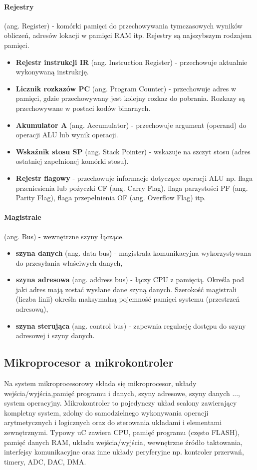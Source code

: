 \documentclass[a4paper,twoside]{report}
\begin{document}
\paragraph{Rejestry} (ang. Register) - komórki pamięci do przechowywania tymczasowych wyników obliczeń, adresów lokacji w pamięci RAM itp. Rejestry są najszybszym rodzajem pamięci.
\begin{itemize}
\item \textbf{Rejestr instrukcji IR} (ang. Instruction Register) - przechowuje aktualnie wykonywaną instrukcję.
\item\textbf{ Licznik rozkazów PC} (ang. Program Counter) - przechowuje adres w pamięci, gdzie przechowywany jest kolejny rozkaz do pobrania. Rozkazy są przechowywane w postaci kodów binarnych.
\item \textbf{Akumulator A} (ang. Accumulator) - przechowuje argument (operand) do operacji ALU lub wynik operacji.
\item \textbf{Wskaźnik stosu SP} (ang. Stack Pointer) - wskazuje na szczyt stosu (adres ostatniej zapełnionej komórki stosu).
\item \textbf{Rejestr flagowy} - przechowuje informacje dotyczące operacji ALU np. flaga przeniesienia lub pożyczki CF (ang. Carry Flag), flaga parzystości PF (ang. Parity Flag), flaga przepełnienia OF (ang. Overflow Flag) itp.
\end{itemize}

\paragraph{Magistrale} (ang. Bus) - wewnętrzne szyny łączące.
\begin{itemize}
\item \textbf{szyna danych} (ang. data bus) - magistrala komunikacyjna wykorzystywana do przesyłania właściwych danych,
\item \textbf{szyna adresowa} (ang. address bus) - łączy CPU z pamięcią. Określa pod jaki adres mają zostać wysłane dane szyną danych. Szerokość magistrali (liczba linii) określa maksymalną pojemność pamięci systemu (przestrzeń adresową),
\item \textbf{szyna sterująca} (ang. control bus) - zapewnia regulację dostępu do szyny adresowej i szyny danych.
\end{itemize}

\subsection{Mikroprocesor a mikrokontroler}
Na system mikroprocesorowy składa się mikroprocesor, układy wejścia/wyjścia,pamięć programu i danych, szyny adresowe, szyny danych ..., system operacyjny. Mikrokontroler to pojedynczy układ scalony zawierający kompletny system, zdolny do samodzielnego wykonywania operacji arytmetycznych i logicznych oraz do sterowania układami i elementami zewnętrznymi. Typowy uC zawiera CPU, pamięć programu (często FLASH), pamięć danych RAM, układu wejścia/wyjścia, wewnętrzne źródło taktowania, interfejsy komunikacyjne oraz inne układy peryferyjne np. kontroler przerwań, timery, ADC, DAC, DMA.
\end{document}
